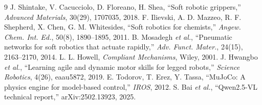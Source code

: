 \documentclass[a4paper,twocolumn,10pt]{ltjsarticle}
\begin{document}
\begin{thebibliography}{9}\small
{} J. Shintake, V. Cacucciolo, D. Floreano, H. Shea, ``Soft robotic grippers,'' \textit{Advanced Materials}, 30(29), 1707035, 2018.
 F. Ilievski, A. D. Mazzeo, R. F. Shepherd, X. Chen, G. M. Whitesides, ``Soft robotics for chemists,'' \textit{Angew. Chem. Int. Ed.}, 50(8), 1890--1895, 2011.
 B. Mosadegh \textit{et al.}, ``Pneumatic networks for soft robotics that actuate rapidly,'' \textit{Adv. Funct. Mater.}, 24(15), 2163--2170, 2014.
 L. L. Howell, \textit{Compliant Mechanisms}, Wiley, 2001.
 J. Hwangbo \textit{et al.}, ``Learning agile and dynamic motor skills for legged robots,'' \textit{Science Robotics}, 4(26), eaau5872, 2019.
 E. Todorov, T. Erez, Y. Tassa, ``MuJoCo: A physics engine for model-based control,'' \textit{IROS}, 2012.
 S. Bai \textit{et al.}, ``Qwen2.5-VL technical report,'' arXiv:2502.13923, 2025.
\end{thebibliography}
\end{document}

